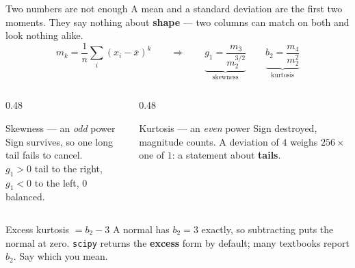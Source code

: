 \documentclass[aspectratio=169]{beamer}
\begin{document}
\begin{frame}[shrink=4]{Two numbers are not enough}
A mean and a standard deviation are the first two moments. They say nothing
about \textbf{shape} --- two columns can match on both and look nothing alike.
\vspace{0.4em}
\[
  m_k = \frac{1}{n}\sum_i (x_i - \bar{x})^k
  \qquad\Longrightarrow\qquad
  \underbrace{g_1 = \frac{m_3}{m_2^{3/2}}}_{\text{skewness}}
  \qquad
  \underbrace{b_2 = \frac{m_4}{m_2^{2}}}_{\text{kurtosis}}
\]
\vspace{0.2em}
\begin{columns}[T]
  \begin{column}{0.48\textwidth}
    \begin{exampleblock}{Skewness --- an \emph{odd} power}
      \small Sign survives, so one long tail fails to cancel.\\
      $g_1>0$ tail to the right, $g_1<0$ to the left, $0$ balanced.
    \end{exampleblock}
  \end{column}
  \begin{column}{0.48\textwidth}
    \begin{exampleblock}{Kurtosis --- an \emph{even} power}
      \small Sign destroyed, magnitude counts. A deviation of $4$ weighs
      $256\times$ one of $1$: a statement about \textbf{tails}.
    \end{exampleblock}
  \end{column}
\end{columns}
\vspace{0.3em}
\begin{alertblock}{Excess kurtosis $= b_2 - 3$}
  \footnotesize A normal has $b_2 = 3$ exactly, so subtracting puts the normal
  at zero. \texttt{scipy} returns the \textbf{excess} form by default; many
  textbooks report $b_2$. Say which you mean.
\end{alertblock}
\end{frame}
\end{document}
